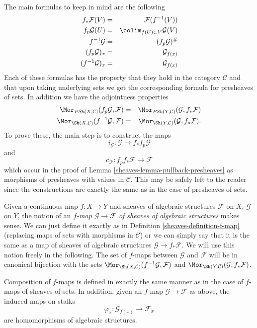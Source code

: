 \medskip\noindent
The main formulas to keep in mind are the following
\begin{eqnarray*}
f_*\mathcal{F}(V) & = & \mathcal{F}(f^{-1}(V)) \\
f_p\mathcal{G}(U) & = & \colim_{f(U) \subset V} \mathcal{G}(V) \\
f^{-1}\mathcal{G} & = & (f_p\mathcal{G})^\# \\
(f_p\mathcal{G})_x & = & \mathcal{G}_{f(x)} \\
(f^{-1}\mathcal{G})_x & = & \mathcal{G}_{f(x)}
\end{eqnarray*}
Each of these formulas has the property that they hold in the
category $\mathcal{C}$ and that upon taking underlying
sets we get the corresponding formula for presheaves of sets.
In addition we have the adjointness properties
\begin{eqnarray*}
\Mor_{\textit{PSh}(X, \mathcal{C})}(f_p\mathcal{G}, \mathcal{F})
& = &
\Mor_{\textit{PSh}(Y, \mathcal{C})}(\mathcal{G}, f_*\mathcal{F}) \\
\Mor_{\Sh(X, \mathcal{C})}(f^{-1}\mathcal{G}, \mathcal{F})
& = &
\Mor_{\Sh(Y, \mathcal{C})}(\mathcal{G}, f_*\mathcal{F}).
\end{eqnarray*}
To prove these, the main step is to construct the maps
$$
i_\mathcal{G} : \mathcal{G} \longrightarrow f_*f_p\mathcal{G}
$$
and
$$
c_\mathcal{F} : f_p f_* \mathcal{F} \longrightarrow \mathcal{F}
$$
which occur in the proof of Lemma \ref{sheaves-lemma-pullback-presheaves} as
morphisms of presheaves with values in $\mathcal{C}$. This may be safely
left to the reader since the constructions are exactly the same
as in the case of presheaves of sets.

\medskip\noindent
Given a continuous map $f : X \to Y$ and sheaves of algebraic
structures $\mathcal{F}$ on $X$, $\mathcal{G}$ on $Y$, the notion
of an {\it $f$-map $\mathcal{G} \to \mathcal{F}$
of sheaves of algebraic structures} makes sense. We can just define
it exactly as in Definition \ref{sheaves-definition-f-map} (replacing maps
of sets with morphisms in $\mathcal{C}$) or we can
simply say that it is the same as a map of sheaves of algebraic
structures $\mathcal{G} \to f_*\mathcal{F}$. We will use this
notion freely in the following. The set of $f$-maps between
$\mathcal{G}$ and $\mathcal{F}$ will be in canonical bijection
with the sets
$\Mor_{\Sh(X, \mathcal{C})}(f^{-1}\mathcal{G}, \mathcal{F})$
and
$\Mor_{\Sh(Y, \mathcal{C})}(\mathcal{G}, f_*\mathcal{F})$.

\medskip\noindent
Composition of $f$-maps is defined in exactly the
same manner as in the case of $f$-maps of sheaves of
sets. In addition, given an $f$-map $\mathcal{G} \to \mathcal{F}$
as above, the induced maps on stalks
$$
\varphi_x : \mathcal{G}_{f(x)} \longrightarrow \mathcal{F}_x
$$
are homomorphisms of algebraic structures.


